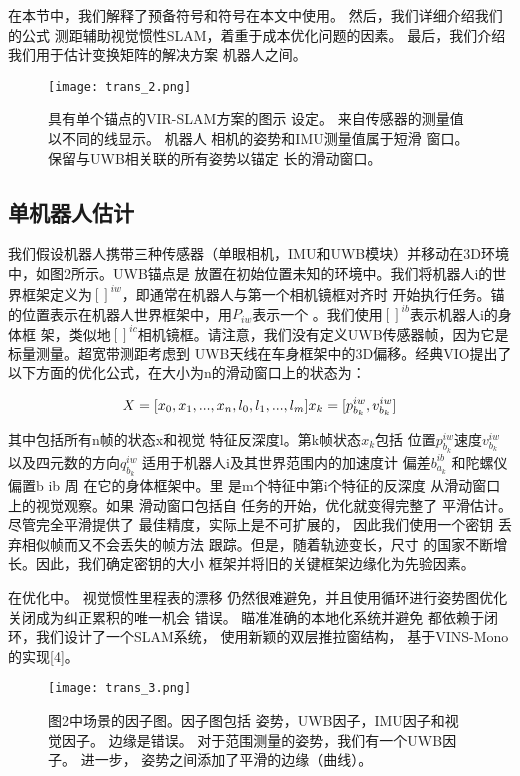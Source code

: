 \begin{translation}
在本节中，我们解释了预备符号和符号在本文中使用。 然后，我们详细介绍我们的公式
测距辅助视觉惯性SLAM，着重于成本优化问题的因素。 最后，我们介绍我们用于估计变换矩阵的解决方案
机器人之间。


\begin{figure}
  \centering
  \texttt{[image: trans\_2.png]}
  \caption{ 具有单个锚点的VIR-SLAM方案的图示
设定。 来自传感器的测量值以不同的线显示。 机器人
相机的姿势和IMU测量值属于短滑
窗口。 保留与UWB相关联的所有姿势以锚定
长的滑动窗口。}
  \label{fig:gmapping}
\end{figure}


\subsection{单机器人估计}


我们假设机器人携带三种传感器（单眼相机，IMU和UWB模块）并移动在3D环境中，如图2所示。UWB锚点是
放置在初始位置未知的环境中。我们将机器人i的世界框架定义为$[]^{iw}$，即通常在机器人与第一个相机镜框对齐时
开始执行任务。锚的位置表示在机器人世界框架中，用$P_{iw}$表示一个 。我们使用$[]^{ib}$表示机器人i的身体框
架，类似地$[]^{ic}$相机镜框。请注意，我们没有定义UWB传感器帧，因为它是标量测量。超宽带测距考虑到
UWB天线在车身框架中的3D偏移。经典VIO提出了以下方面的优化公式，在大小为n的滑动窗口上的状态为：

\begin{equation}
  X = [x_0, x_1, ..., x_n, l_0, l_1, ..., l_m] \\
    x_k = [p_{b_k}^{iw}, v_{b_k}^{iw}]
\end{equation}

其中包括所有n帧的状态x和视觉 特征反深度l。第k帧状态$x_k$包括 位置$p_{b_k}^{iw}$速度$v_{b_k}^{iw}$
以及四元数的方向$q_{b_k}^{iw}$ 适用于机器人i及其世界范围内的加速度计 偏差$b_{a_k}^{ib}$
和陀螺仪偏置b ib 周 在它的身体框架中。里 是m个特征中第i个特征的反深度 从滑动窗口上的视觉观察。如果
滑动窗口包括自 任务的开始，优化就变得完整了 平滑估计。尽管完全平滑提供了 最佳精度，实际上是不可扩展的，
因此我们使用一个密钥 丢弃相似帧而又不会丢失的帧方法 跟踪。但是，随着轨迹变长，尺寸 的国家不断增长。因此，我们确定密钥的大小
框架并将旧的关键框架边缘化为先验因素。

在优化中。 视觉惯性里程表的漂移 仍然很难避免，并且使用循环进行姿势图优化 关闭成为纠正累积的唯一机会
错误。 瞄准准确的本地化系统并避免 都依赖于闭环，我们设计了一个SLAM系统， 使用新颖的双层推拉窗结构，
基于VINS-Mono的实现[4]。


\begin{figure}
  \centering
  \texttt{[image: trans\_3.png]}
  \caption{图2中场景的因子图。因子图包括
姿势，UWB因子，IMU因子和视觉因子。 边缘是错误。
对于范围测量的姿势，我们有一个UWB因子。 进一步，
姿势之间添加了平滑的边缘（曲线）。}
  \label{fig:gmapping}
\end{figure}



\end{translation}
